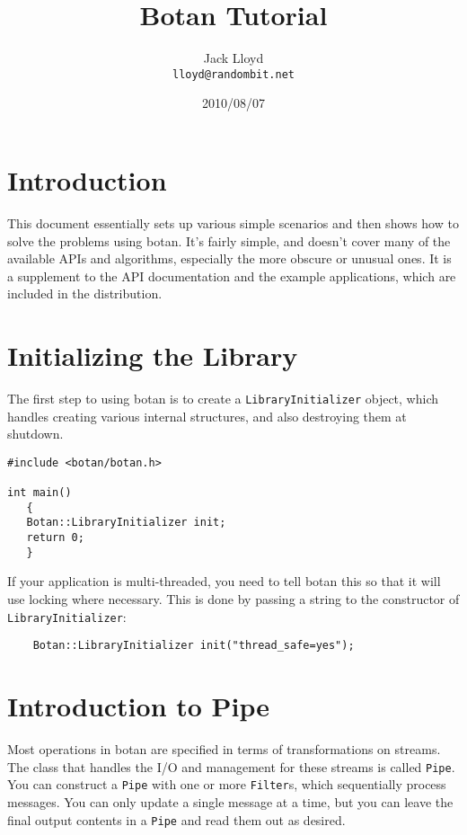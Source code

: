 \documentclass{article}
\title{\textbf{Botan Tutorial}}
\author{Jack Lloyd \\
        \texttt{lloyd@randombit.net}}
\date{2010/08/07}
\newcommand{\type}[1]{\texttt{#1}}
\begin{document}
\maketitle

\tableofcontents

\parskip=5pt
\pagebreak

\section{Introduction}

This document essentially sets up various simple scenarios and then
shows how to solve the problems using botan. It's fairly simple, and
doesn't cover many of the available APIs and algorithms, especially
the more obscure or unusual ones. It is a supplement to the API
documentation and the example applications, which are included in the
distribution.

\section{Initializing the Library}

The first step to using botan is to create a \type{LibraryInitializer}
object, which handles creating various internal structures, and also
destroying them at shutdown.

\begin{verbatim}
#include <botan/botan.h>

int main()
   {
   Botan::LibraryInitializer init;
   return 0;
   }
\end{verbatim}

If your application is multi-threaded, you need to tell botan this so
that it will use locking where necessary. This is done by passing a
string to the constructor of \type{LibraryInitializer}:

\begin{verbatim}
    Botan::LibraryInitializer init("thread_safe=yes");
\end{verbatim}

\section{Introduction to Pipe}

Most operations in botan are specified in terms of transformations on
streams. The class that handles the I/O and management for these
streams is called \type{Pipe}. You can construct a \type{Pipe} with
one or more \type{Filter}s, which sequentially process messages. You
can only update a single message at a time, but you can leave the
final output contents in a \type{Pipe} and read them out as desired.
\end{document}

